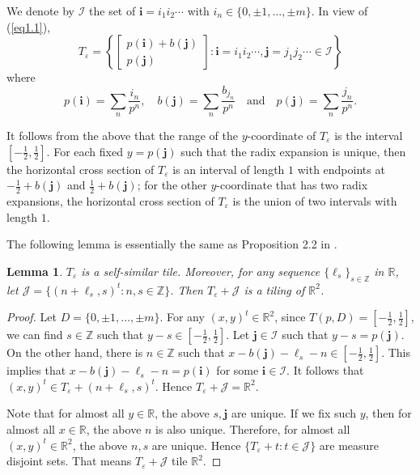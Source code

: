 \documentclass[12pt, reqno]{amsart}
\newtheorem{Lem}[theorem]{Lemma}
\numberwithin{equation}{section}
\begin{document}
We denote by ${\mathcal I}$ the set of ${\mathbf i}=i_1i_2\cdots$ with $i_n\in \{0,\pm1,\dots,\pm m\}$. In view of (\ref{eq1.1}),
\begin{equation}\label{eq2.1}
T_\varepsilon=\left\{ \left[\begin{array}{c}
p({\mathbf i})+b({\mathbf j})\\
p({\mathbf j})
\end{array}\right]: {\mathbf i}=i_1i_2\cdots,{\mathbf j}=j_1j_2\cdots\in {\mathcal I}  \right\}
\end{equation}
where $$p({\mathbf i})=\sum_n \frac{i_n}{p^n},\quad b({\mathbf j})=\sum_n \frac{b_{j_n}}{p^n} \quad \text{and} \quad p({\mathbf j})=\sum_n \frac{j_n}{p^n}.$$

 It follows from the above that the range of the $y$-coordinate of $T_\varepsilon$ is the interval $[-\frac{1}{2},\frac{1}{2}]$. For each fixed $y=p({\mathbf j})$ such that the radix expansion is unique, then the horizontal cross section of $T_\varepsilon$ is an interval of length $1$ with endpoints at $-\frac{1}{2}+b({\mathbf j})$ and $\frac{1}{2}+b({\mathbf j})$; for the other $y$-coordinate that has two radix expansions, the horizontal cross section of $T_\varepsilon$ is the union of two intervals with length $1$.

The following lemma is essentially the same as Proposition 2.2 in \cite{DeLa}.

\begin{Lem}\label{lem2.1}
$T_\varepsilon$ is a self-similar tile. Moreover, for any sequence $\{\ell_s\}_{s\in {\mathbb Z}}$ in ${\mathbb R}$, let ${\mathcal J}=\{(n+\ell_s,s)^t: n,s\in{\mathbb Z}\}$. Then $T_\varepsilon+{\mathcal J}$ is a tiling of ${\mathbb R}^2$.
\end{Lem}

\begin{proof}
Let $D=\{0,\pm1,\dots, \pm m\}$. For any $(x,y)^t\in {\mathbb R}^2$, since $T(p,D)=[-\frac{1}{2},\frac{1}{2}]$, we can find $s\in {\mathbb Z}$ such that $y-s\in [-\frac{1}{2},\frac{1}{2}]$. Let ${\mathbf j}\in {\mathcal I}$ such that $y-s=p({\mathbf j})$.  On the other hand, there is $n\in {\mathbb Z}$ such that $x-b({\mathbf j})-\ell_s-n\in [-\frac{1}{2},\frac{1}{2}]$. This implies that $x-b({\mathbf j})-\ell_s-n=p({\mathbf i})$ for some ${\mathbf i}\in {\mathcal I}$. It follows that $(x,y)^t\in T_\varepsilon+(n+\ell_s,s)^t$. Hence $T_\varepsilon+{\mathcal J}={\mathbb R}^2$.

Note that for almost all $y\in {\mathbb R}$, the above $s, {\mathbf j}$ are unique. If we fix such $y$, then for almost all $x\in {\mathbb R}$, the above $n$ is also unique. Therefore, for almost all $(x,y)^t\in {\mathbb R}^2$, the above $n,s$ are unique. Hence $\{T_\varepsilon+t: t\in{\mathcal J}\}$ are measure disjoint sets. That means
$T_\varepsilon+{\mathcal J}$ tile ${\mathbb R}^2$.
\end{proof}
\end{document}
